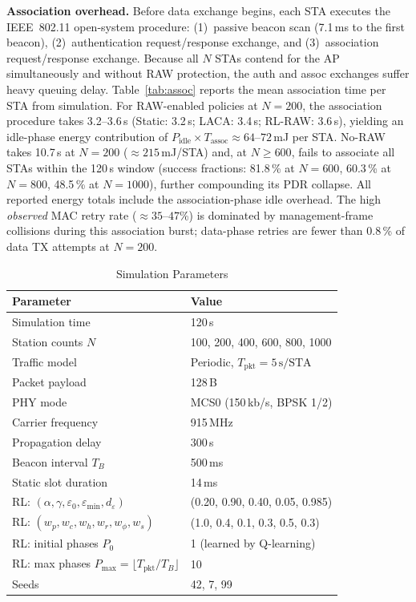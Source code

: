 \documentclass[conference]{IEEEtran}
\begin{document}
\textbf{Association overhead.}
Before data exchange begins, each STA executes the IEEE~802.11 open-system
procedure: (1)~passive beacon scan (7.1\,ms to the first beacon),
(2)~authentication request/response exchange, and
(3)~association request/response exchange.
Because all $N$ STAs contend for the AP simultaneously and without RAW
protection, the auth and assoc exchanges suffer heavy queuing delay.
Table~\ref{tab:assoc} reports the mean association time per STA from
simulation.
For RAW-enabled policies at $N=200$, the association procedure takes
3.2–3.6\,s (Static: 3.2\,s; LACA: 3.4\,s; RL-RAW: 3.6\,s),
yielding an idle-phase energy contribution of
$P_\text{idle}\times T_\text{assoc}\approx 64$–$72$\,mJ per STA.
No-RAW takes 10.7\,s at $N=200$ ($\approx215$\,mJ/STA) and, at $N\!\geq\!600$,
fails to associate all STAs within the 120\,s window
(success fractions: 81.8\,\% at $N=600$, 60.3\,\% at $N=800$,
48.5\,\% at $N=1000$), further compounding its PDR collapse.
All reported energy totals include the association-phase idle overhead.
The high \emph{observed} MAC retry rate ($\approx35$–$47$\%) is dominated
by management-frame collisions during this association burst; data-phase
retries are fewer than 0.8\,\% of data TX attempts at $N=200$.

\begin{table}[t]
\centering
\caption{Simulation Parameters}
\label{tab:params}
\begin{tabular}{ll}
\toprule
Parameter & Value \\
\midrule
Simulation time          & 120\,s \\
Station counts $N$       & 100, 200, 400, 600, 800, 1000 \\
Traffic model            & Periodic, $T_\text{pkt} = 5\,\text{s/STA}$ \\
Packet payload           & 128\,B \\
PHY mode                 & MCS0 (150\,kb/s, BPSK 1/2) \\
Carrier frequency        & 915\,MHz \\
Propagation delay        & 300\,\textmu{}s \\
Beacon interval $T_B$    & 500\,ms \\
Static slot duration     & 14\,ms \\
RL: $(\alpha, \gamma, \varepsilon_0, \varepsilon_\text{min}, d_\varepsilon)$ & (0.20, 0.90, 0.40, 0.05, 0.985) \\
RL: $(w_p, w_c, w_h, w_r, w_\phi, w_s)$ & (1.0, 0.4, 0.1, 0.3, 0.5, 0.3) \\
RL: initial phases $P_0$ & 1 (learned by Q-learning) \\
RL: max phases $P_\text{max} = \lfloor T_\text{pkt}/T_B \rfloor$ & 10 \\
Seeds                    & 42, 7, 99 \\
\bottomrule
\end{tabular}
\end{table}
\end{document}
